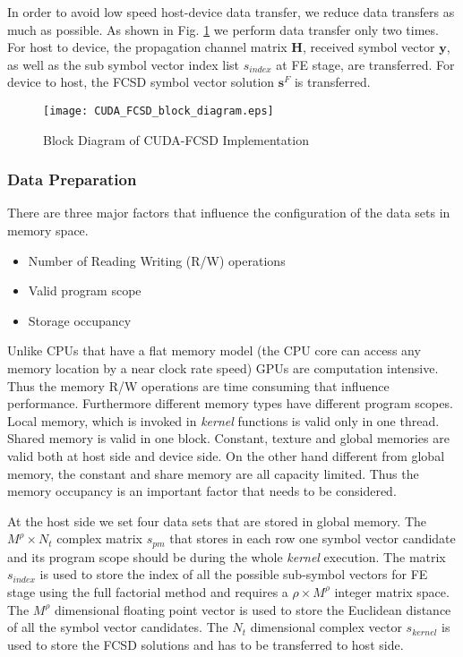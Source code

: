 \documentclass[letterpaper, 10pt, conference]{ieeeconf}
\begin{document}
In order to avoid low speed host-device data transfer, we reduce data transfers as much as possible. As shown in Fig. \ref{block diagram} we perform data transfer only two times. For host to device, the propagation channel matrix $\mathbf{H}$, received symbol vector $\mathbf{y}$, as well as the sub symbol vector index list $\mathit{s_{index}}$ at FE stage, are transferred. For device to host, the FCSD symbol vector solution $\mathbf{s}^{F}$ is transferred.
\begin{figure}[htb]
\centering
\texttt{[image: CUDA\_FCSD\_block\_diagram.eps]}
\caption{Block Diagram of CUDA-FCSD Implementation}
\label{block diagram}
\end{figure}
\subsubsection{Data Preparation}\label{data preparation}
There are three major factors that influence the configuration of the data sets in memory space.
\begin{itemize}
\item Number of Reading Writing (R/W) operations
\item Valid program scope
\item Storage occupancy
\end{itemize}

Unlike CPUs that have a flat memory model (the CPU core can access any memory location by a near clock rate speed) GPUs are computation intensive. Thus the memory R/W operations are time consuming that influence performance. Furthermore different memory types have different program scopes. Local memory, which is invoked in \textit{kernel} functions is valid only in one thread. Shared memory is valid in one block. Constant, texture and global memories are valid both at host side and device side. On the other hand different from global memory, the constant and share memory are all capacity limited. Thus the memory occupancy is an important factor that needs to be considered.
 
At the host side we set four data sets that are stored in global memory. The $M^{\rho}\times N_{t}$ complex matrix $\mathit{s_{pm}}$ that stores in each row one symbol vector candidate and its program scope should be during the whole \textit{kernel} execution. The matrix $\mathit{s_{index}}$ is used to store the index of all the possible sub-symbol vectors for  FE stage using the full factorial method and requires a $\rho\times M^{\rho}$  integer matrix space. The $M^{\rho}$ dimensional floating point vector is used to store the Euclidean distance of all the symbol vector candidates. The $N_{t}$ dimensional complex vector $\mathit{s_{kernel}}$ is used to store the FCSD solutions and has to be transferred to host side.
\end{document}
